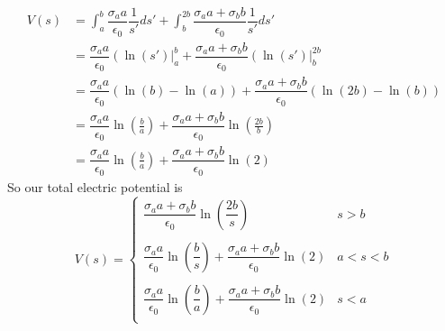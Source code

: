 \documentclass[11pt]{article}
\numberwithin{equation}{section}
\begin{document}
\begin{align*}
V(s) &= \int_a^{b}\dfrac{\sigma_aa}{\epsilon_0}\dfrac{1}{s'}ds' + \int_b^{2b}\dfrac{\sigma_aa+\sigma_bb}{\epsilon_0}\dfrac{1}{s'}ds'\\
&= \dfrac{\sigma_aa}{\epsilon_0}\left(\ln(s')\right|_a^{b} + \dfrac{\sigma_aa+\sigma_bb}{\epsilon_0}\left(\ln(s')\right|_b^{2b}\\
&= \dfrac{\sigma_aa}{\epsilon_0}\left(\ln(b)-\ln(a)\right) + \dfrac{\sigma_aa+\sigma_bb}{\epsilon_0}\left(\ln(2b)-\ln(b)\right)\\
&= \dfrac{\sigma_aa}{\epsilon_0}\ln\left(\frac{b}{a}\right) + \dfrac{\sigma_aa+\sigma_bb}{\epsilon_0}\ln\left(\frac{2b}{b}\right)\\
&= \dfrac{\sigma_aa}{\epsilon_0}\ln\left(\frac{b}{a}\right) + \dfrac{\sigma_aa+\sigma_bb}{\epsilon_0}\ln\left(2\right)
\end{align*}
So our total electric potential is
$$V(s) = \left\{\begin{array}{lc}
\dfrac{\sigma_aa+\sigma_bb}{\epsilon_0}\ln\left(\dfrac{2b}{s}\right)	&s>b\\
\\
\dfrac{\sigma_aa}{\epsilon_0}\ln\left(\dfrac{b}{s}\right) + \dfrac{\sigma_aa+\sigma_bb}{\epsilon_0}\ln\left(2\right)	&a<s<b\\
\\
\dfrac{\sigma_aa}{\epsilon_0}\ln\left(\dfrac{b}{a}\right) + \dfrac{\sigma_aa+\sigma_bb}{\epsilon_0}\ln\left(2\right)	&s<a\\
\end{array}\right.$$
\end{document}
